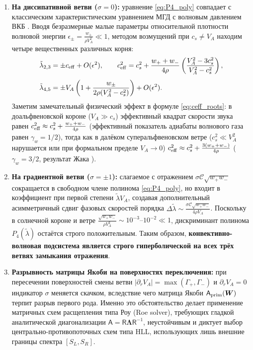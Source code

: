 \documentclass[11pt,a4paper]{article}
\begin{document}
\begin{enumerate}
\item \textbf{На диссипативной ветви ($\sigma = 0$):} уравнение \eqref{eq:P4_poly} совпадает с классическим характеристическим уравнением МГД с волновым давлением ВКБ \cite{Jacques1977,vanderHolst2014}. Вводя безразмерные малые параметры относительной плотности волновой энергии $\epsilon_\pm = \frac{w_\pm}{\rho V_A^2} \ll 1$, методом возмущений при $c_s \neq V_A$ находим четыре вещественных различных корня:
\begin{align}
\tilde{\lambda}_{2,3} &= \pm c_{\rm eff} + O(\epsilon^2), \qquad c_{\rm eff}^2 = c_s^2 + \frac{w_+ + w_-}{4\rho}\left(\frac{V_A^2 - 3c_s^2}{V_A^2 - c_s^2}\right),
\label{eq:ceff_roots}\\[4pt]
\tilde{\lambda}_{4,5} &= \pm V_A\left(1 + \frac{w_\pm}{2\rho(V_A^2 - c_s^2)}\right) + O(\epsilon^2).
\label{eq:va_roots}
\end{align}
Заметим замечательный физический эффект в формуле \eqref{eq:ceff_roots}: в доальфвеновской короне ($V_A \gg c_s$) эффективный квадрат скорости звука равен $c_{\rm eff}^2 \approx c_s^2 + \frac{w_+ + w_-}{4\rho}$ (эффективный показатель адиабаты волнового газа равен $\gamma_w = 1/2$), тогда как в далёком суперальфвеновском ветре ($c_s^2 \ll V_A^2$ нарушается или при формальном пределе $V_A \to 0$) $c_{\rm eff}^2 \approx c_s^2 + \frac{3(w_+ + w_-)}{4\rho}$ ($\gamma_w = 3/2$, результат Жака \cite{Jacques1977}).
\item \textbf{На градиентной ветви ($\sigma = \pm 1$):} слагаемое с отражением $\sigma\mathcal{C}\sqrt{w_+ w_-}$ сокращается в свободном члене полинома \eqref{eq:P4_poly}, но входит в коэффициент при первой степени $\tilde{\lambda} V_A$, создавая дополнительный асимметричный сдвиг фазовых скоростей порядка $\Delta\tilde{\lambda} \sim \frac{\sigma\mathcal{C}\sqrt{w_+ w_-}}{4\rho V_A}$. Поскольку в солнечной короне и ветре $\frac{\sqrt{w_+ w_-}}{\rho V_A^2} \sim 10^{-3}\text{--}10^{-2} \ll 1$, дискриминант полинома $P_4(\tilde{\lambda})$ остаётся строго положительным. Таким образом, \textbf{конвективно-волновая подсистема является строго гиперболической на всех трёх ветвях замыкания отражения}.
\item \textbf{Разрывность матрицы Якоби на поверхностях переключения:} при пересечении поверхностей смены ветви $|\partial_r V_A| = \max(\Gamma_+,\Gamma_-)$ и $\partial_r V_A = 0$ индикатор $\sigma$ меняется скачком, вследствие чего матрица Якоби $\mathsf{A}_{\rm prim}(\bm{W})$ терпит разрыв первого рода. Именно это обстоятельство делает применение матричных схем расщепления типа Роу (Roe solver), требующих гладкой аналитической диагонализации $\mathsf{A} = \mathsf{R}\bm{\Lambda}\mathsf{R}^{-1}$, неустойчивым и диктует выбор центрально-противопоточных схем типа HLL, использующих лишь внешние границы спектра $[S_L, S_R]$.
\end{enumerate}
\end{document}
